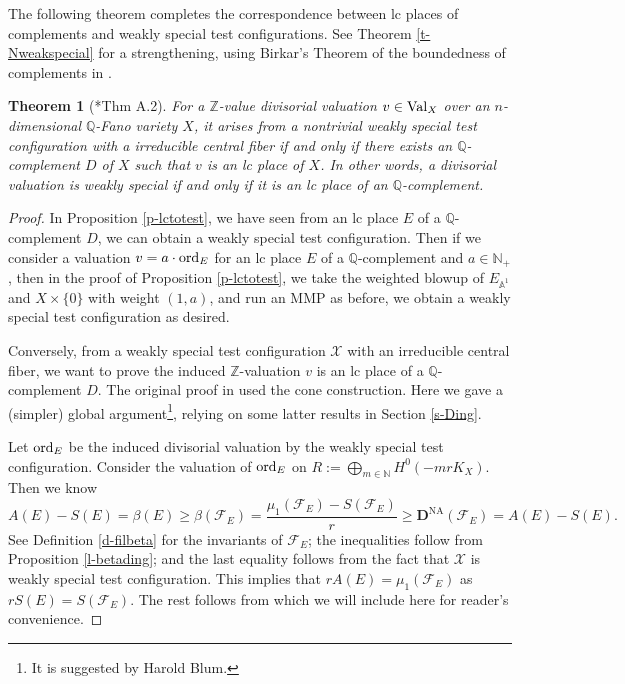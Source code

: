 \documentclass[12pt,reqno]{amsart}%
\newcommand{\bN}{{\mathbb{N} }}
\newcommand{\bZ}{{\mathbb{Z} }}
\newcommand{\cX}{{\mathcal{X}}}
\newcommand{\cF}{\mathcal{F}}
\newcommand{\DNA}{\mathbf{D}^{\mathrm{NA}}}
\newcommand{\ord}{{\rm ord}}
\newtheorem{thm}{Theorem}[section]
\theoremstyle{definition}
\theoremstyle{remark}
\newcommand{\Val}{{\rm Val}}
\newcommand{\bQ}{{\mathbb{Q}}}
\begin{document}
The following theorem completes the correspondence between lc places of complements and weakly special test configurations. See Theorem \ref{t-Nweakspecial} for a strengthening, using Birkar's Theorem of the boundedness of complements in \cite{Bir19}.  
\begin{thm}[{\cite{BLX19}*{Thm A.2}}]\label{t-weakspecial}
For a $\bZ$-value divisorial valuation $v\in \Val_X$ over an $n$-dimensional $\bQ$-Fano variety $X$, it  arises from a nontrivial weakly special test configuration with a irreducible central fiber if and only if there exists an $\mathbb{Q}$-complement $D$ of $X$ such that $v$ is an lc place of $X$. In other words, a divisorial valuation is weakly special if and only if it is an lc place of an $\mathbb{Q}$-complement. 
\end{thm}
\begin{proof} In Proposition \ref{p-lctotest}, we have seen from an lc place $E$ of a $\mathbb Q$-complement $D$, we can obtain a weakly special test configuration.
Then if we consider a valuation $v=a\cdot \ord_E$ for an lc place $E$ of a $\mathbb{Q}$-complement and $a\in \mathbb N_+$, then in the proof of Proposition \ref{p-lctotest}, we take the weighted blowup of $E_{\mathbb{A}^1}$ and $X\times\{0\}$ with weight $(1,a)$, and run an MMP as before, we obtain a weakly special test configuration as desired. 


\smallskip

Conversely, from a weakly special test configuration $\cX$ with an irreducible central fiber, we want to prove the induced $\bZ$-valuation $v$ is an lc place of a $\bQ$-complement $D$. The original proof in \cite{BLX19} used the cone construction. Here we gave a (simpler) global argument\footnote{It is suggested by Harold Blum.}, relying on some latter results in Section \ref{s-Ding}.

Let $\ord_E$ be the induced divisorial valuation by the weakly special test configuration.  Consider the valuation of $\ord_E$ on $R:=\bigoplus_{m\in \bN}H^0(-mrK_X)$. Then we know 
$$A(E)-S(E)=\beta(E)\ge \beta(\cF_E)=\frac{\mu_1(\cF_{E})-S(\cF_E)}{r}\ge \DNA(\cF_E)=A(E)-S(E).$$
See Definition \ref{d-filbeta} for the invariants of $\cF_E$; the inequalities follow from Proposition \ref{l-betading};
and the last equality follows from the fact that $\cX$ is weakly special test configuration. This implies that $rA(E)=\mu_1({\cF_{E}})$ as $rS(E)=S(\cF_E)$. The rest follows from \cite[Theorem A.7]{XZ19} which we will include here for reader's convenience.


\end{proof}
\end{document}
